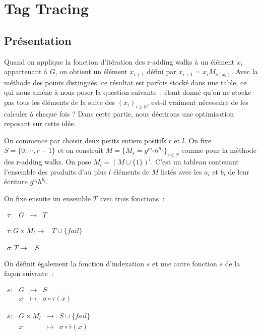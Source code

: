         \section{Tag Tracing}
        \subsection{Présentation}
        Quand on applique la fonction d'itération des r-adding walks à un élément $x_i$ appartenant à $G$, on obtient un élément $x_{i+1}$ défini par $x_{i+1} = x_i M_{s(x_i)}$. Avec la méthode des points distingués, ce résultat est parfois stocké dans une table, ce qui nous amène à nous poser la question suivante~: étant donné qu'on ne stocke pas tous les éléments de la suite des $(x_i)_{i \ge 0}$, est-il vraiment nécessaire de les calculer à chaque fois ? Dans cette partie, nous décrirons une optimisation reposant sur cette idée.
    	
    	On commence par choisir deux petits entiers positifs $r$ et $l$. On fixe $S=\{0,\cdots,r-1\}$ et on construit $M=\{M_s = g^{m_s} h^{n_s}\}_{s \in S}$ comme pour la méthode des r-adding walks. On pose $M_l = (M\cup\{1\})^l$. C'est un tableau contenant l'ensemble des produits d'au plus $l$ éléments de $M$ listés avec les $a_i$ et $b_i$ de leur écriture $g^{a_i} h^{b_i}$.
    	
    	On fixe ensuite un ensemble $T$ avec trois fonctions~:
    	
		$\begin{array}{lrcl}
		\tau : & G & \longrightarrow & T
		\end{array}$
		
		$\begin{array}{lrcl}
		\overline{\tau} : G \times M_l \longrightarrow & T \cup \{fail\}
		\end{array}$
		
		$\begin{array}{lrcl}
		\sigma : T \longrightarrow & S
		\end{array}$
		
		On définit également la fonction d'indexation $s$ et une autre fonction $\overline{s}$ de la façon suivante~:
		
		$\begin{array}{lrcl}
		s : & G & \longrightarrow & S \\
		    & x & \longmapsto & \sigma \circ \tau (x)
		\end{array}$
		
		$\begin{array}{lrcl}
		\overline{s} : & G \times M_l & \longrightarrow & S \cup \{fail\} \\
		               & x & \longmapsto & \sigma \circ \overline{\tau} (x)
		\end{array}$
		
